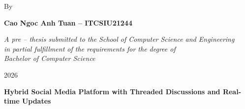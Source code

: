 \documentclass[12pt, twoside]{report}
\begin{document}
\begin{titlepage}
	\vspace{1.5cm}
	By \par \textbf{Cao Ngoc Anh Tuan -- ITCSIU21244}

	\vspace{4.5cm}
	\textit{A pre -- thesis submitted to the School of Computer Science and Engineering \\
		in partial fulfillment of the requirements for the degree of \\
		Bachelor of Computer Science}

	\vspace{2cm}
	 \par 2026

	\newpage

	\centering
	\textbf{\large Hybrid Social Media Platform with Threaded Discussions and Real-time Updates}\par
	\vspace{4cm}

	\hspace{7cm}
	\par
	\vspace{2cm}

	\hspace{7cm}
	\makebox[7cm][l]{\underline{\hspace{7cm}}}
	\par \hspace{7cm}
	\par
	\vspace{2cm}

	\hspace{7cm}
	\makebox[7cm][l]{\underline{\hspace{7cm}}}
	\par \hspace{7cm}
	\par
	\vspace{2cm}

	\hspace{7cm}
	\makebox[7cm][l]{\underline{\hspace{7cm}}}
	\par \hspace{7cm}
	\par
	\vspace{2cm}

	\hspace{7cm}
	\makebox[7cm][l]{\underline{\hspace{7cm}}}
	\par \hspace{7cm}
	\par
	\vspace{2cm}


\end{titlepage}
\end{document}
